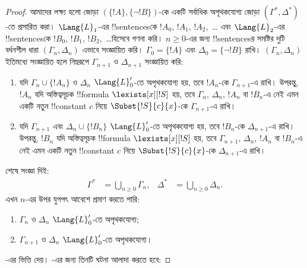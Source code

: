\documentclass[../../../include/open-logic-section]{subfiles}
\begin{document}
\begin{proof}
আমাদের লক্ষ্য হলো জোড়া $(\{ !A \}, \{\lnot!B\})$-কে একটি
সর্বাধিক অপৃথকযোগ্য জোড়া $(\Gamma^*, \Delta^*)$-তে প্রসারিত করা।
$\Lang{L}_1$-এর !!{sentence}sকে $!A_0$, $!A_1$, $!A_2$, \,\dots
এবং $\Lang{L}_2$-এর !!{sentence}sকে $!B_0$, $!B_1$, $!B_2$,
\,\dots হিসেবে গণনা করি। $n \ge 0$-এর জন্য !!{sentence}sর
সমষ্টির দুটি বর্ধনশীল ধারা $(\Gamma_n, \Delta_n)$ এভাবে সংজ্ঞায়িত
করি। $\Gamma_0 = \{ !A\}$ এবং $\Delta_0 = \{\lnot !B \}$ রাখি।
$(\Gamma_n, \Delta_n)$ ইতিমধ্যে সংজ্ঞায়িত হলে নিম্নরূপে
$\Gamma_{n+1}$ ও $\Delta_{n+1}$ সংজ্ঞায়িত করি:
\begin{enumerate}
\item যদি $\Gamma_n \cup \{!A_n \}$ ও $\Delta_n$
  $\Lang{L}'_0$-তে অপৃথকযোগ্য হয়, তবে $!A_n$-কে
  $\Gamma_{n+1}$-এ রাখি। উপরন্তু, $!A_n$ যদি অস্তিত্বসূচক
  !!{formula} $\lexists[x][!S]$ হয়, তবে $\Gamma_n$, $\Delta_n$,
  $!A_n$ বা $!B_n$-এ নেই এমন একটি নতুন !!{constant} $c$ নিয়ে
  $\Subst{!S}{c}{x}$-কে $\Gamma_{n+1}$-এ রাখি।
\item যদি $\Gamma_{n+1}$ এবং $\Delta_n \cup \{!B_n \}$
  $\Lang{L}'_0$-তে অপৃথকযোগ্য হয়, তবে $!B_n$-কে
  $\Delta_{n+1}$-এ রাখি। উপরন্তু, $!B_n$ যদি অস্তিত্বসূচক
  !!{formula} $\lexists[x][!S]$ হয়, তবে $\Gamma_{n+1}$,
  $\Delta_n$, $!A_n$ বা $!B_n$-এ নেই এমন একটি নতুন !!{constant} $c$
  নিয়ে $\Subst{!S}{c}{x}$-কে $\Delta_{n+1}$-এ রাখি।
\end{enumerate}
শেষে সংজ্ঞা দিই:
\begin{align*}
  \Gamma^* & = \bigcup_{n\ge 0} \Gamma_n, &
  \Delta^* & = \bigcup_{n\ge 0} \Delta_n.
\end{align*}
এখন $n$-এর উপর যুগপৎ আবেশে প্রমাণ করতে পারি:
\begin{enumerate}
\item{} $\Gamma_n$ ও $\Delta_n$
  $\Lang{L}'_0$-তে অপৃথকযোগ্য;
\item{} $\Gamma_{n+1}$ ও $\Delta_n$
    $\Lang{L}'_0$-তে অপৃথকযোগ্য।
\end{enumerate}
-এর ভিত্তি  দেয়।
-এর জন্য তিনটি ঘটনা আলাদা করতে হবে:
\end{proof}
\end{document}
